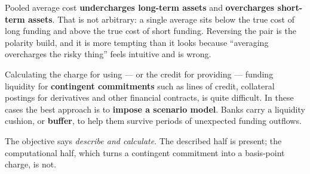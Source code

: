 \begin{lrtrapbox}
Pooled average cost \textbf{undercharges long-term assets} and \textbf{overcharges short-term assets}. That is not arbitrary: a single average sits below the true cost of long funding and above the true cost of short funding. Reversing the pair is the polarity build, and it is more tempting than it looks because ``averaging overcharges the risky thing'' feels intuitive and is wrong.
\end{lrtrapbox}


\begin{lrkeybox}
Calculating the charge for using --- or the credit for providing --- funding liquidity for \textbf{contingent commitments} such as lines of credit, collateral postings for derivatives and other financial contracts, is quite difficult. In these cases the best approach is to \textbf{impose a scenario model}. Banks carry a liquidity cushion, or \textbf{buffer}, to help them survive periods of unexpected funding outflows.
\end{lrkeybox}

\gapbadge
{}

\begin{lrgapbox}
The objective says \emph{describe and calculate}. The described half is present; the computational half, which turns a contingent commitment into a basis-point charge, is not.
\end{lrgapbox}

